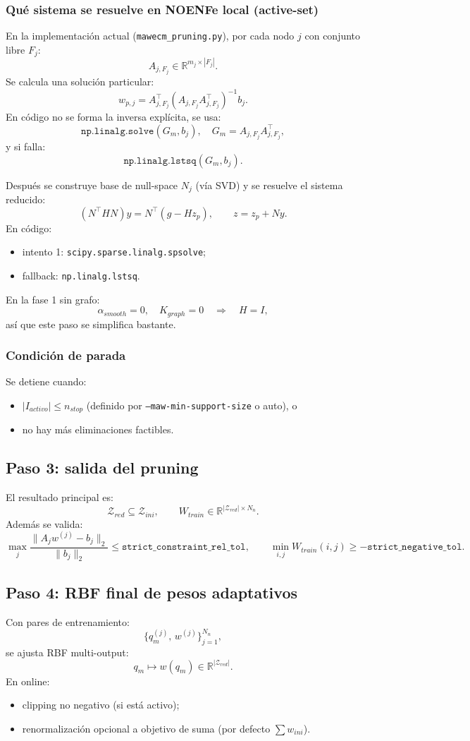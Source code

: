 \documentclass[11pt,a4paper]{article}
\begin{document}
\subsubsection*{Qué sistema se resuelve en NOENFe local (active-set)}
En la implementación actual (\texttt{mawecm\_pruning.py}),
por cada nodo $j$ con conjunto libre $F_j$:
\[
A_{j,F_j}\in\mathbb{R}^{m_j\times |F_j|}.
\]
Se calcula una solución particular:
\[
w_{p,j}=A_{j,F_j}^\top\left(A_{j,F_j}A_{j,F_j}^\top\right)^{-1}b_j.
\]
En código no se forma la inversa explícita, se usa:
\[
\texttt{np.linalg.solve}(G_m,b_j),\quad G_m=A_{j,F_j}A_{j,F_j}^\top,
\]
y si falla:
\[
\texttt{np.linalg.lstsq}(G_m,b_j).
\]

Después se construye base de null-space $N_j$ (vía SVD) y se resuelve el sistema reducido:
\[
\left(N^\top HN\right)y=N^\top\left(g-Hz_p\right),
\qquad
z=z_p+Ny.
\]
En código:
\begin{itemize}[leftmargin=1.5em]
\item intento 1: \texttt{scipy.sparse.linalg.spsolve};
\item fallback: \texttt{np.linalg.lstsq}.
\end{itemize}

En la fase 1 sin grafo:
\[
\alpha_{smooth}=0,\quad K_{graph}=0\quad\Rightarrow\quad H=I,
\]
así que este paso se simplifica bastante.

\subsubsection*{Condición de parada}
Se detiene cuando:
\begin{itemize}[leftmargin=1.5em]
\item $|I_{activo}|\le n_{stop}$ (definido por \texttt{--maw-min-support-size} o auto), o
\item no hay más eliminaciones factibles.
\end{itemize}

\subsection{Paso 3: salida del pruning}
El resultado principal es:
\[
\mathcal Z_{red}\subseteq\mathcal Z_{ini},
\qquad
W_{train}\in\mathbb{R}^{|\mathcal Z_{red}|\times N_n}.
\]
Además se valida:
\[
\max_j\frac{\|A_jw^{(j)}-b_j\|_2}{\|b_j\|_2}\le \texttt{strict\_constraint\_rel\_tol},
\qquad
\min_{i,j}W_{train}(i,j)\ge -\texttt{strict\_negative\_tol}.
\]

\subsection{Paso 4: RBF final de pesos adaptativos}
Con pares de entrenamiento:
\[
\big\{q_m^{(j)},\,w^{(j)}\big\}_{j=1}^{N_n},
\]
se ajusta RBF multi-output:
\[
q_m\mapsto w(q_m)\in\mathbb{R}^{|\mathcal Z_{red}|}.
\]
En online:
\begin{itemize}[leftmargin=1.5em]
\item clipping no negativo (si está activo);
\item renormalización opcional a objetivo de suma (por defecto $\sum w_{ini}$).
\end{itemize}
\end{document}
